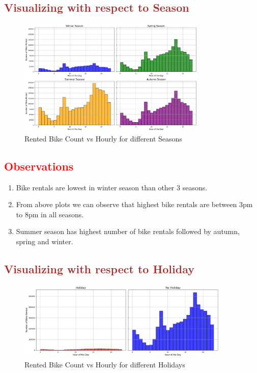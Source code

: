 \documentclass[12pt, letterpaper]{article}
\begin{document}
\subsection*{\textcolor{brown}{Visualizing with respect to Season}}
\begin{figure}[h]
  \centering
  \includegraphics[width=0.8\textwidth]{season1.png}
  \caption{Rented Bike Count vs Hourly for different Seasons}
\end{figure}

\subsection*{\textcolor{red}{Observations}}
\begin{enumerate}
  \item Bike rentals are lowest in winter season than other 3 seasons.
  \item From above plots we can observe that highest bike rentals are between 3pm to 8pm in all seasons.
  \item Summer season has highest number of bike rentals followed by autumn, spring and winter. 
\end{enumerate}

\newpage

\subsection*{\textcolor{brown}{Visualizing with respect to Holiday}}
\begin{figure}[h]
  \centering
  \includegraphics[width=0.9\textwidth]{holiday1.png}
  \caption{Rented Bike Count vs Hourly for different Holidays}
\end{figure}
\end{document}
